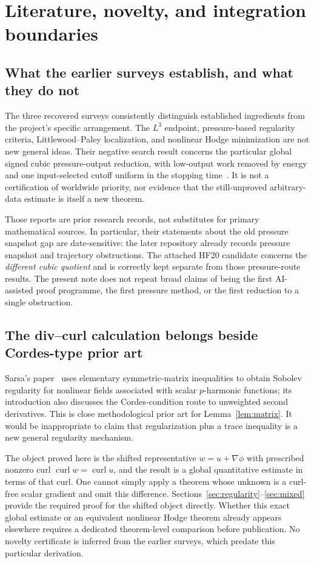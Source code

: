 \documentclass[11pt,a4paper]{article}
\theoremstyle{definition}
\DeclareMathOperator{\curl}{curl}
\begin{document}
\section{Literature, novelty, and integration boundaries}\label{sec:literature}

\subsection{What the earlier surveys establish, and what they do not}
The three recovered surveys consistently distinguish established ingredients from the project's specific arrangement. The $L^3$ endpoint, pressure-based regularity criteria, Littlewood--Paley localization, and nonlinear Hodge minimization are not new general ideas. Their negative search result concerns the particular global signed cubic pressure-output reduction, with low-output work removed by energy and one input-selected cutoff uniform in the stopping time~\cite{Survey1,Survey2,Survey3}. It is not a certification of worldwide priority, nor evidence that the still-unproved arbitrary-data estimate is itself a new theorem.

Those reports are prior research records, not substitutes for primary mathematical sources. In particular, their statements about the old pressure snapshot gap are date-sensitive: the later repository already records pressure snapshot and trajectory obstructions. The attached HF20 candidate concerns the \emph{different cubic quotient} and is correctly kept separate from those pressure-route results. The present note does not repeat broad claims of being the first AI-assisted proof programme, the first pressure method, or the first reduction to a single obstruction.

\subsection{The div--curl calculation belongs beside Cordes-type prior art}
Sarsa's paper~\cite{Sarsa} uses elementary symmetric-matrix inequalities to obtain Sobolev regularity for nonlinear fields associated with scalar $p$-harmonic functions; its introduction also discusses the Cordes-condition route to unweighted second derivatives. This is close methodological prior art for Lemma~\ref{lem:matrix}. It would be inappropriate to claim that regularization plus a trace inequality is a new general regularity mechanism.

The object proved here is the shifted representative $w=u+\nabla\phi$ with prescribed nonzero curl $\curl w=\curl u$, and the result is a global quantitative estimate in terms of that curl. One cannot simply apply a theorem whose unknown is a curl-free scalar gradient and omit this difference. Sections~\ref{sec:regularity}--\ref{sec:mixed} provide the required proof for the shifted object directly. Whether this exact global estimate or an equivalent nonlinear Hodge theorem already appears elsewhere requires a dedicated theorem-level comparison before publication. No novelty certificate is inferred from the earlier surveys, which predate this particular derivation.
\end{document}
